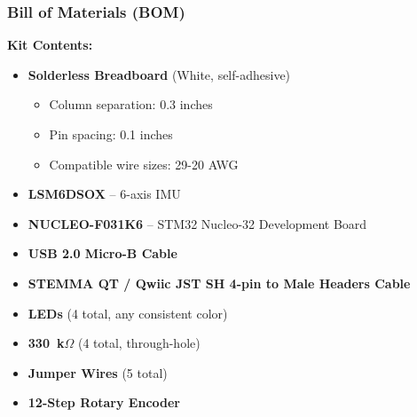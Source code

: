 \documentclass{beamer}
\begin{document}
\begin{frame}
    \frametitle{Bill of Materials (BOM)}
    \textbf{Kit Contents:}
    \begin{itemize}
        \item \textbf{Solderless Breadboard} (White, self-adhesive)
            \begin{itemize}
                \item Column separation: 0.3 inches
                \item Pin spacing: 0.1 inches
                \item Compatible wire sizes: 29-20 AWG
            \end{itemize}
        \item \textbf{LSM6DSOX} – 6-axis IMU
        \item \textbf{NUCLEO-F031K6} – STM32 Nucleo-32 Development Board
        \item \textbf{USB 2.0 Micro-B Cable}
        \item \textbf{STEMMA QT / Qwiic JST SH 4-pin to Male Headers Cable}
        \item \textbf{LEDs} (4 total, any consistent color)
        \item \textbf{330~k$\Omega$} (4 total, through-hole)
        \item \textbf{Jumper Wires} (5 total)
        \item \textbf{12-Step Rotary Encoder}
    \end{itemize}
\end{frame}
\end{document}
